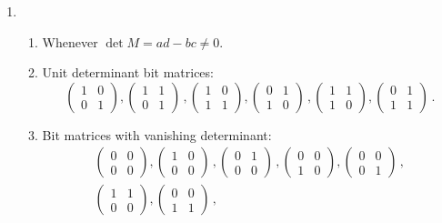\begin{enumerate}
\item 
\begin{enumerate}
\item Whenever $\det M=ad-bc\neq 0$.
\item Unit determinant bit matrices:
\[
\begin{pmatrix}
1&0\\0&1
\end{pmatrix},
\begin{pmatrix}
1&1\\0&1
\end{pmatrix}\, ,
\begin{pmatrix}
1&0\\1&1
\end{pmatrix},
\begin{pmatrix}
0&1\\1&0
\end{pmatrix}\, ,
\begin{pmatrix}
1&1\\1&0
\end{pmatrix},
\begin{pmatrix}
0&1\\1&1
\end{pmatrix}\,.
\]
\item Bit matrices with vanishing determinant:
\begin{gather*}
\begin{pmatrix}
0&0\\0&0
\end{pmatrix},
\begin{pmatrix}
1&0\\0&0
\end{pmatrix}\, ,
\begin{pmatrix}
0&1\\0&0
\end{pmatrix}\, ,
\begin{pmatrix}
0&0\\1&0
\end{pmatrix},
\begin{pmatrix}
0&0\\0&1
\end{pmatrix}\, ,\\
\begin{pmatrix}
1&1\\0&0
\end{pmatrix},
\begin{pmatrix}
0&0\\1&1
\end{pmatrix}\,,

\end{gather*}
\end{enumerate}
\end{enumerate}
